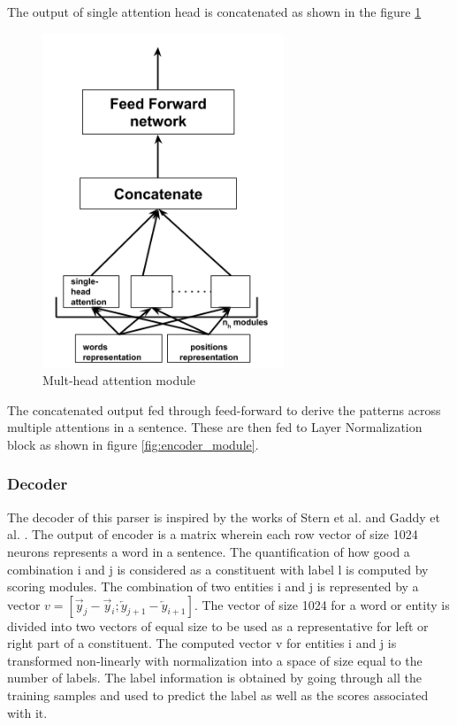 \documentclass[a4paper, 11pt]{article}
\begin{document}
The output of single attention head is concatenated as shown in the figure \ref{fig:multi_head_attention_module}
\begin{figure}[htpb]
    \centering
    \includegraphics[width=\textwidth,height=10cm,keepaspectratio=true]
    {multi-head-attention.png}
    \caption{
        Mult-head attention module
    }
    \label{fig:multi_head_attention_module}
\end{figure}

The concatenated output fed through feed-forward to derive the patterns across multiple attentions in a sentence. These are then fed to Layer Normalization block as shown in figure \ref{fig:encoder_module}.

\subsubsection{Decoder}
The decoder of this parser is inspired by the works of Stern et al. \parencite{Stern2017} and Gaddy et al. \parencite{Gaddy2018}. The output of encoder is a matrix wherein each row vector of size 1024 neurons represents a word in a sentence. The quantification of how good a combination i and j is considered as a constituent with label l is computed by scoring modules. The combination of two entities i and j is represented by a vector  $v = [\overrightarrow{y}_j - \overrightarrow{y}_i; \overleftarrow{y}_{j+1} - \overleftarrow{y}_{i+1}]$. The vector of size 1024 for a word or entity is divided into two vectors of equal size to be used as a representative for left or right part of a constituent. The computed vector v for entities i and j  is transformed non-linearly with normalization into a space of size equal to the number of labels. The label information is obtained by going through all the training samples and used to predict the label as well as the scores associated with it. 
\end{document}

